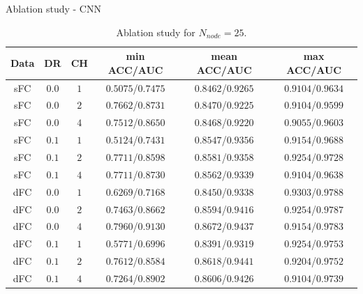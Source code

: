 \documentclass{beamer}
\begin{document}
\begin{frame}{Ablation study - CNN}

    \begin{table}[H]
        \centering
        \begin{tabular}{|c|c|c|c|c|c|}
            \hline
            Data & DR    & CH  & min ACC/AUC       & mean ACC/AUC      & max ACC/AUC       \\
            \hline
            sFC  & $0.0$ & $1$ & $0.5075$/$0.7475$ & $0.8462$/$0.9265$ & $0.9104$/$0.9634$ \\
            \hline
            sFC  & $0.0$ & $2$ & $0.7662$/$0.8731$ & $0.8470$/$0.9225$ & $0.9104$/$0.9599$ \\
            \hline
            sFC  & $0.0$ & $4$ & $0.7512$/$0.8650$ & $0.8468$/$0.9220$ & $0.9055$/$0.9603$ \\
            \hline
            sFC  & $0.1$ & $1$ & $0.5124$/$0.7431$ & $0.8547$/$0.9356$ & $0.9154$/$0.9688$ \\
            \hline
            sFC  & $0.1$ & $2$ & $0.7711$/$0.8598$ & $0.8581$/$0.9358$ & $0.9254$/$0.9728$ \\
            \hline
            sFC  & $0.1$ & $4$ & $0.7711$/$0.8730$ & $0.8562$/$0.9339$ & $0.9104$/$0.9638$ \\
            \hline
            dFC  & $0.0$ & $1$ & $0.6269$/$0.7168$ & $0.8450$/$0.9338$ & $0.9303$/$0.9788$ \\
            \hline
            dFC  & $0.0$ & $2$ & $0.7463$/$0.8662$ & $0.8594$/$0.9416$ & $0.9254$/$0.9787$ \\
            \hline
            dFC  & $0.0$ & $4$ & $0.7960$/$0.9130$ & $0.8672$/$0.9437$ & $0.9154$/$0.9783$ \\
            \hline
            dFC  & $0.1$ & $1$ & $0.5771$/$0.6996$ & $0.8391$/$0.9319$ & $0.9254$/$0.9753$ \\
            \hline
            dFC  & $0.1$ & $2$ & $0.7612$/$0.8584$ & $0.8618$/$0.9441$ & $0.9204$/$0.9752$ \\
            \hline
            dFC  & $0.1$ & $4$ & $0.7264$/$0.8902$ & $0.8606$/$0.9426$ & $0.9104$/$0.9739$ \\
            \hline
        \end{tabular}
        \caption{Ablation study for $N_{node} = 25$.}
    \end{table}

\end{frame}
\end{document}
